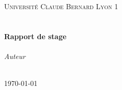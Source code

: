 \begin{titlepage}
  \begin{center}

    \textsc{\LARGE Université Claude Bernard Lyon 1}\\[1.5cm]
    \textsc{\Large}\\[0.5cm]

    \HRule\\[0.4cm]
    {\huge \bfseries Rapport de stage\\[0.4cm]}
    \HRule\\[1.5cm]

    \emph{Auteur}\\[0.1cm]
    \noindent{}\\[1cm]

    \noindent{}

    \vfill

    {\large \today}

  \end{center}
\end{titlepage}
